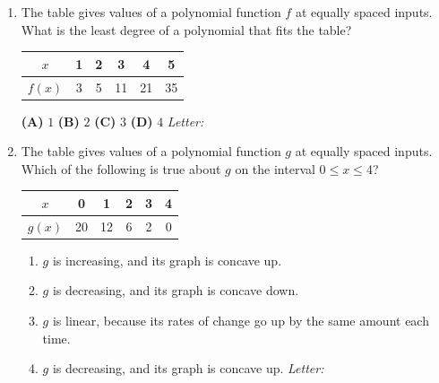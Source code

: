 \documentclass[10pt]{article}
\begin{document}
\begin{enumerate}[leftmargin=1.9em, itemsep=8pt]

\item \begin{minipage}[t]{0.56\linewidth}
      The table gives values of a polynomial function $f$ at equally spaced inputs. What is the
      least degree of a polynomial that fits the table?
      \end{minipage}\hfill
      \begin{minipage}[t]{0.4\linewidth}
      \vspace{-2pt}\centering
      \renewcommand{\arraystretch}{1.2}
      \begin{tabular}{|c|c|c|c|c|c|}
      \hline
      $x$    & 1 & 2 & 3  & 4  & 5  \\ \hline
      $f(x)$ & 3 & 5 & 11 & 21 & 35 \\ \hline
      \end{tabular}
      \end{minipage}

      \smallskip

      \textbf{(A)} $1$ \hspace{3em} \textbf{(B)} $2$ \hspace{3em} \textbf{(C)} $3$ \hspace{3em} \textbf{(D)} $4$ \hfill\textit{Letter:}~\gradedblank[id=ap1, type=choice, points=1, answer=B]{0.42in}{13pt}

\item \begin{minipage}[t]{0.56\linewidth}
      The table gives values of a polynomial function $g$ at equally spaced inputs. Which of the
      following is true about $g$ on the interval $0 \le x \le 4$?
      \end{minipage}\hfill
      \begin{minipage}[t]{0.4\linewidth}
      \vspace{-2pt}\centering
      \renewcommand{\arraystretch}{1.2}
      \begin{tabular}{|c|c|c|c|c|c|}
      \hline
      $x$    & 0  & 1  & 2 & 3 & 4 \\ \hline
      $g(x)$ & 20 & 12 & 6 & 2 & 0 \\ \hline
      \end{tabular}
      \end{minipage}
      \begin{enumerate}[leftmargin=2.6em, itemsep=2pt]
        \item[(A)] $g$ is increasing, and its graph is concave up.
        \item[(B)] $g$ is decreasing, and its graph is concave down.
        \item[(C)] $g$ is linear, because its rates of change go up by the same amount each time.
        \item[(D)] $g$ is decreasing, and its graph is concave up. \hfill\textit{Letter:}~\gradedblank[id=ap2, type=choice, points=1, answer=D]{0.42in}{13pt}
      \end{enumerate}


\end{enumerate}
\end{document}
